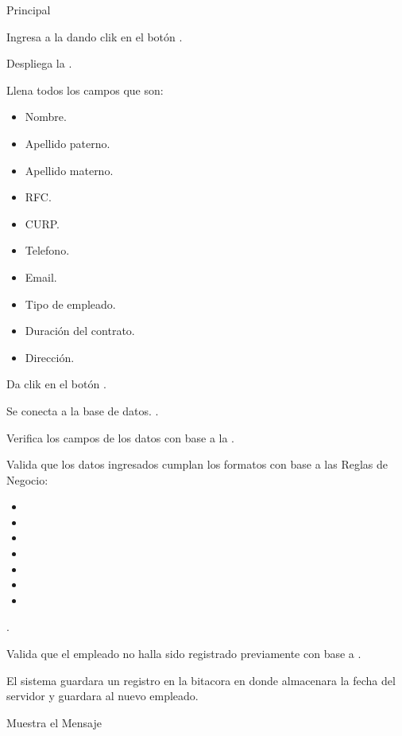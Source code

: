 	\begin{UCtrayectoria}{Principal}
	
		\UCpaso[\UCactor] Ingresa a la  dando clik en el botón . 
		
		\UCpaso Despliega la .

		\UCpaso[\UCactor] Llena todos los campos que son: 
			\begin{itemize}
				\item Nombre.
				\item Apellido paterno.
				\item Apellido materno.
				\item RFC.
				\item CURP.
				\item Telefono.
				\item Email.
				\item Tipo de empleado.
				\item Duración del contrato.
				\item Dirección.
			\end{itemize} 
		\label{CU16RegistrarEmpleado}

		\UCpaso[\UCactor] Da clik en el botón .\label{CU16ConectarBaseDatos}

		\UCpaso Se conecta a la base de datos. .

		\UCpaso Verifica los campos de los datos con base a la  .

		\UCpaso Valida que los datos ingresados cumplan los formatos con base a las Reglas de Negocio: 
				
			\begin{itemize}
				\item	{} 
				\item	{} 
				\item	{} 
				\item	{} 
				\item	{} 
				\item	{} 
				\item	{} 
			\end{itemize} 
		.

		\UCpaso Valida que el empleado no halla sido registrado previamente con base a  .

		\UCpaso El sistema guardara un registro en la bitacora en donde almacenara la fecha del servidor y guardara  al nuevo empleado.

		\UCpaso Muestra el Mensaje 
		

	\end{UCtrayectoria}




